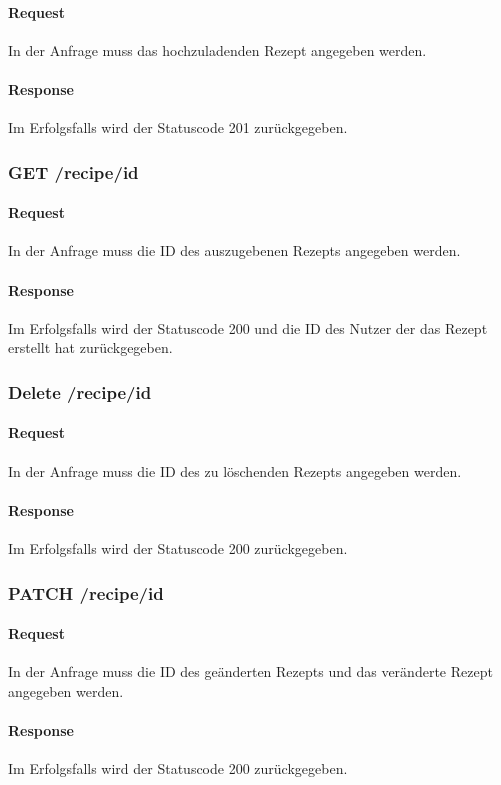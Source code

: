 \documentclass{entwurfsheft}
\begin{document}
    \paragraph{Request}
        In der Anfrage muss das hochzuladenden Rezept angegeben werden.
    \paragraph{Response}
        Im Erfolgsfalls wird der Statuscode 201 zurückgegeben.

\subsubsection*{GET /recipe/id} 
    \paragraph{Request}
        In der Anfrage muss die ID des auszugebenen Rezepts angegeben werden.
    \paragraph{Response}
        Im Erfolgsfalls wird der Statuscode 200 und die ID des Nutzer der das Rezept erstellt hat zurückgegeben.

\subsubsection*{Delete /recipe/id}
    \paragraph{Request}
        In der Anfrage muss die ID des zu löschenden Rezepts angegeben werden.
    \paragraph{Response}
        Im Erfolgsfalls wird der Statuscode 200 zurückgegeben.

\subsubsection*{PATCH /recipe/id}
    \paragraph{Request}
        In der Anfrage muss die ID des geänderten Rezepts und das veränderte Rezept angegeben werden.
    \paragraph{Response}
        Im Erfolgsfalls wird der Statuscode 200 zurückgegeben.
\end{document}
